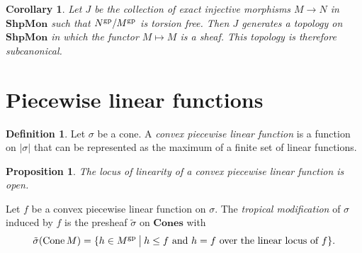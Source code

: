 \documentclass[12pt]{amsart}
\theoremstyle{plan}
\newtheorem{proposition}[theorem]{Proposition}
\newtheorem{corollary}{Corollary}
\numberwithin{lemma}{theorem}
\numberwithin{corollary}{theorem}
\theoremstyle{definition}
\newtheorem{definition}[theorem]{Definition}
\theoremstyle{remark}
\def\ShpMon{\mathbf{ShpMon}}
\def\Cones{\mathbf{Cones}}
\def\Cone{\operatorname{Cone}}
\begin{document}
\begin{corollary}
Let $J$ be the collection of \emph{exact} injective morphisms $M \to N$ in $\ShpMon$ such that $N^{\rm gp} / M^{\rm gp}$ is torsion free.  Then $J$ generates a topology on $\ShpMon$ in which the functor $M \mapsto M$ is a sheaf.  This topology is therefore subcanonical.
\end{corollary}

\section{Piecewise linear functions}

\begin{definition}
Let $\sigma$ be a cone.  A \emph{convex piecewise linear function} is a function on $|\sigma|$ that can be represented as the maximum of a finite set of linear functions.
\end{definition}

\begin{proposition}
The locus of linearity of a convex piecewise linear function is open.
\end{proposition}

Let $f$ be a convex piecewise linear function on $\sigma$.  The \emph{tropical modification} of $\sigma$ induced by $f$ is the presheaf $\tilde\sigma$ on $\Cones$ with
\begin{equation*}
\tilde\sigma(\Cone M) = \{ h \in M^{\rm gp} \: \big| \: \text{$h \leq f$ and $h = f$ over the linear locus of $f$} \} .
\end{equation*}



\end{document}
